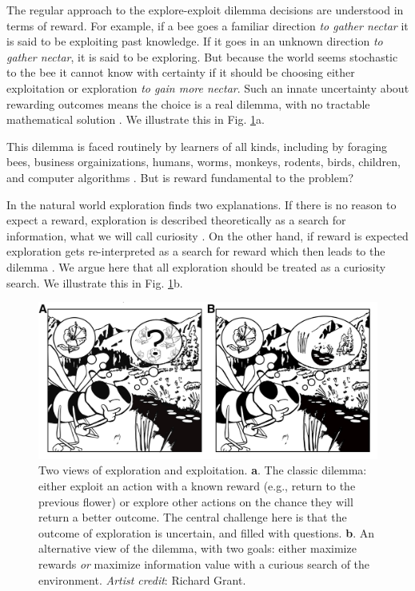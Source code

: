 The regular approach to the explore-exploit dilemma decisions are understood in terms of reward. For example, if a bee goes a familiar direction \textit{to gather nectar} it is said to be exploiting past knowledge. If it goes in an unknown direction \textit{to gather nectar}, it is said to be exploring. But because the world seems stochastic to the bee it cannot know with certainty if it should be choosing either exploitation or exploration \textit{to gain more nectar}. Such an innate uncertainty about rewarding outcomes means the choice is a real dilemma, with no tractable mathematical solution \cite{Thrun1992a,Dayan1996,Ishii2002,Simsek2006,Gershman2018b}. We illustrate this in Fig. \ref{fig:bee}a. 

This dilemma is faced routinely by learners of all kinds, including by foraging bees, business orgainizations, humans, worms, monkeys, rodents, birds, children, and computer algorithms \cite{Gupta2006,Sutton2018,Woodgate2017,Lee2011a,Schulz2018a,Calhoun2014,Wang2019,Sumner2019,Auersperg2015}. But is reward fundamental to the problem? 

In the natural world exploration finds two explanations. If there is no reason to expect a reward, exploration is described theoretically as a search for information, what we will call curiosity \cite{Berlyne1950,Schmidhuber1991,Kidd2015,deAbril2018,Jaegle2019,Friston2016}. On the other hand, if reward is expected exploration gets re-interpreted as a search for reward which then leads to the dilemma \cite{Kelly1956,Berger-Tal2014,Dayan1996,Thrun1992,Mehlhorn2015,Kobayashi2019}. We argue here that all exploration should be treated as a curiosity search. We illustrate this in Fig. \ref{fig:bee}b.

\begin{figure}
	\begin{fullwidth}
	\includegraphics[width=.5\linewidth]{figures/fig1.png} 
	\caption{Two views of exploration and exploitation. \textbf{a}. The classic dilemma: either exploit an action with a known reward (e.g., return to the previous flower) or explore other actions on the chance they will return a better outcome. The central challenge here is that the outcome of exploration is uncertain, and filled with questions. \textbf{b}. An alternative view of the dilemma, with two goals: either maximize rewards \textit{or} maximize information value with a curious search of the environment. \textit{Artist credit}: Richard Grant.}
	\label{fig:bee} 
	\end{fullwidth}
\end{figure}

